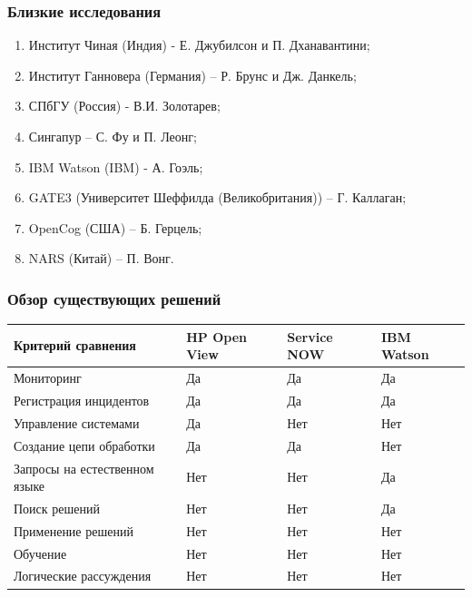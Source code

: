 \documentclass[14pt]{beamer}
\begin{document}
\begin{frame}
\frametitle{Близкие исследования}
\begin{enumerate}
 \item Институт Чиная (Индия) - Е. Джубилсон и П. Дханавантини;
 \item Институт Ганновера (Германия) – Р. Брунс и Дж. Данкель;
 \item СПбГУ (Россия) - В.И. Золотарев;
 \item Сингапур – С. Фу и П. Леонг;
 \item IBM Watson (IBM) - А. Гоэль;
 \item GATE3 (Университет Шеффилда (Великобритания)) – Г. Каллаган;
 \item OpenCog (США) –  Б. Герцель;
 \item NARS (Китай) – П. Вонг.
\end{enumerate}
\end{frame}



\begin{frame}
\frametitle{Обзор существующих решений}
\begin{table}
	
\small
\begin{tabular} {|p{5cm}|p{1cm}|p{1.5cm}|p{1.5cm}|}

\hline
\textbf{Критерий сравнения} & HP Open View & Service NOW & IBM Watson\\
\hline
   Мониторинг & Да & Да & Да  \\
   \hline
   Регистрация инцидентов & Да & Да & Да \\
   \hline
   Управление системами & Да & Нет & Нет  \\
   \hline 
   Создание цепи обработки & Да & Да & Нет \\
   \hline 
   Запросы на естественном языке & Нет & Нет & Да \\
   \hline 
   Поиск решений & Нет & Нет & Да \\
   \hline 
   Применение решений & Нет & Нет & Нет  \\
   \hline
   Обучение & Нет & Нет & Нет \\
   \hline
   Логические рассуждения & Нет & Нет & Нет  \\
   \hline
  
\end{tabular}
\end{table}
\end{frame}
\end{document}

